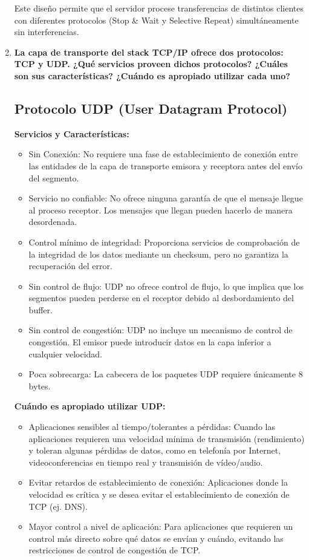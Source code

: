 \begin{enumerate}
    Este diseño permite que el servidor procese transferencias de distintos clientes con diferentes protocolos (Stop \& Wait y Selective Repeat) simultáneamente sin interferencias.
    
    
    \item \textbf{La capa de transporte del stack TCP/IP ofrece dos protocolos: TCP y UDP. ¿Qué servicios proveen dichos protocolos? ¿Cuáles son sus características? ¿Cuándo es apropiado utilizar cada uno?}
    
    \subsection*{Protocolo UDP (User Datagram Protocol)}
    
    \textbf{Servicios y Características:}
    \begin{itemize}
        \item Sin Conexión: No requiere una fase de establecimiento de conexión entre las entidades de la capa de transporte emisora y receptora antes del envío del segmento.
        \item Servicio no confiable: No ofrece ninguna garantía de que el mensaje llegue al proceso receptor. Los mensajes que llegan pueden hacerlo de manera desordenada.
        \item Control mínimo de integridad: Proporciona servicios de comprobación de la integridad de los datos mediante un checksum, pero no garantiza la recuperación del error.
        \item Sin control de flujo: UDP no ofrece control de flujo, lo que implica que los segmentos pueden perderse en el receptor debido al desbordamiento del buffer.
        \item Sin control de congestión: UDP no incluye un mecanismo de control de congestión. El emisor puede introducir datos en la capa inferior a cualquier velocidad.
        \item Poca sobrecarga: La cabecera de los paquetes UDP requiere únicamente 8 bytes.
    \end{itemize}
    
    \textbf{Cuándo es apropiado utilizar UDP:}
    \begin{itemize}
        \item Aplicaciones sensibles al tiempo/tolerantes a pérdidas: Cuando las aplicaciones requieren una velocidad mínima de transmisión (rendimiento) y toleran algunas pérdidas de datos, como en telefonía por Internet, videoconferencias en tiempo real y transmisión de vídeo/audio.
        \item Evitar retardos de establecimiento de conexión: Aplicaciones donde la velocidad es crítica y se desea evitar el establecimiento de conexión de TCP (ej. DNS).
        \item Mayor control a nivel de aplicación: Para aplicaciones que requieren un control más directo sobre qué datos se envían y cuándo, evitando las restricciones de control de congestión de TCP.
    \end{itemize}
    

\end{enumerate}
